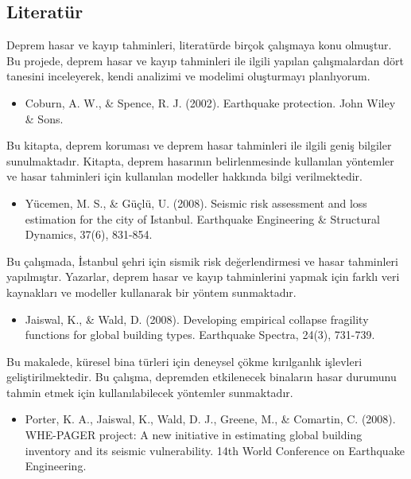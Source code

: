 \documentclass[
  12pt,
]{article}
\providecommand{\tightlist}{%
  \setlength{\itemsep}{0pt}\setlength{\parskip}{0pt}}
\begin{document}
\hypertarget{literatuxfcr}{%
\subsection{Literatür}\label{literatuxfcr}}

Deprem hasar ve kayıp tahminleri, literatürde birçok çalışmaya konu olmuştur. Bu projede, deprem hasar ve kayıp tahminleri ile ilgili yapılan çalışmalardan dört tanesini inceleyerek, kendi analizimi ve modelimi oluşturmayı planlıyorum.

\begin{itemize}
\tightlist
\item
  Coburn, A. W., \& Spence, R. J. (2002). Earthquake protection. John Wiley \& Sons.
\end{itemize}

Bu kitapta, deprem koruması ve deprem hasar tahminleri ile ilgili geniş bilgiler sunulmaktadır. Kitapta, deprem hasarının belirlenmesinde kullanılan yöntemler ve hasar tahminleri için kullanılan modeller hakkında bilgi verilmektedir.

\begin{itemize}
\tightlist
\item
  Yücemen, M. S., \& Güçlü, U. (2008). Seismic risk assessment and loss estimation for the city of Istanbul. Earthquake Engineering \& Structural Dynamics, 37(6), 831-854.
\end{itemize}

Bu çalışmada, İstanbul şehri için sismik risk değerlendirmesi ve hasar tahminleri yapılmıştır. Yazarlar, deprem hasar ve kayıp tahminlerini yapmak için farklı veri kaynakları ve modeller kullanarak bir yöntem sunmaktadır.

\begin{itemize}
\tightlist
\item
  Jaiswal, K., \& Wald, D. (2008). Developing empirical collapse fragility functions for global building types. Earthquake Spectra, 24(3), 731-739.
\end{itemize}

Bu makalede, küresel bina türleri için deneysel çökme kırılganlık işlevleri geliştirilmektedir. Bu çalışma, depremden etkilenecek binaların hasar durumunu tahmin etmek için kullanılabilecek yöntemler sunmaktadır.

\begin{itemize}
\tightlist
\item
  Porter, K. A., Jaiswal, K., Wald, D. J., Greene, M., \& Comartin, C. (2008). WHE-PAGER project: A new initiative in estimating global building inventory and its seismic vulnerability. 14th World Conference on Earthquake Engineering.
\end{itemize}
\end{document}
